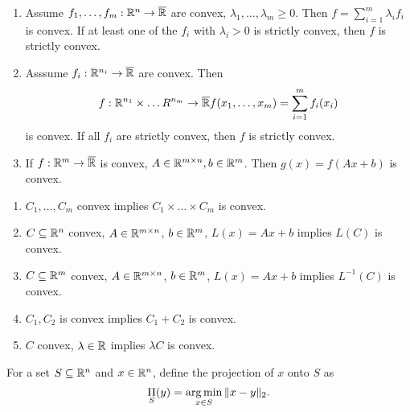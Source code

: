 \begin{thm}
  \label{sec:convexity-10}
  \begin{enumerate}
  \item Assume $f_{1}, \dots, f_{m}: \mathbb{R}^{n} \rightarrow \overline {\mathbb{R}}$
    are convex, $\lambda_{1}, \dots, \lambda_{m} \geq 0$.  Then $f =
    \sum_{i=1}^{m} \lambda_{i} f_{i}$ is convex.  If at least one of
    the $f_{i}$ with $\lambda_{i} > 0$ is strictly convex, then $f$ is
    strictly convex.
  \item Asssume $f_{i}: \mathbb{R}^{n_{i}} \rightarrow \overline {\mathbb{R}}$ are
    convex.  Then
    \begin{align}
      \label{eq:7}
      f: \mathbb{R}^{n_{1}} \times \dots R^{n_{m}} \rightarrow \overline {\mathbb{R}}
      f(x_{1}, \dots, x_{m}) = \sum_{i=1}^{m} f_{i}(x_{i})
    \end{align} is convex. If all $f_{i}$ are strictly convex, then
    $f$ is strictly convex.
  \item If $f: \mathbb{R}^{m} \rightarrow \overline {\mathbb{R}}$ is convex, $A \in
    \mathbb{R}^{m \times n}, b \in \mathbb{R}^{m}$.  Then $g(x) = f(Ax + b)$ is convex.
  \end{enumerate}
\end{thm}

\begin{thm}
  \label{sec:convexity-11}
  \begin{enumerate}
  \item $C_{1}, \dots, C_{m}$ convex implies $C_{1} \times \dots
    \times C_{m}$ is convex.
  \item $C \subseteq \mathbb{R}^{n}$ convex, $A \in \mathbb{R}^{m \times n}$, $b \in
    \mathbb{R}^{m}$, $L(x) = Ax + b$ implies $L(C)$ is convex.
  \item $C \subseteq \mathbb{R}^{m}$ convex, $A \in \mathbb{R}^{m \times n}$, $b \in
    \mathbb{R}^{m}$, $L(x) = Ax + b$ implies $L^{-1}(C)$ is convex.
  \item $C_{1}, C_{2}$ is convex implies $C_{1} + C_{2}$ is convex.
  \item $C$ convex, $\lambda \in \mathbb{R}$ implies $\lambda C$ is convex.
  \end{enumerate}
\end{thm}

\begin{defn}
  \label{sec:convexity-12}
  For a set $S \subseteq \mathbb{R}^{n}$ and $x \in \mathbb{R}^{n}$, define the
  projection of $x$ onto $S$ as
  \begin{equation}
    \label{eq:9}
    \operatorname*{\Pi}_{S}(y) = \operatorname*{arg\,min}_{x \in S} \|x - y\|_{2}.
  \end{equation}
\end{defn}

